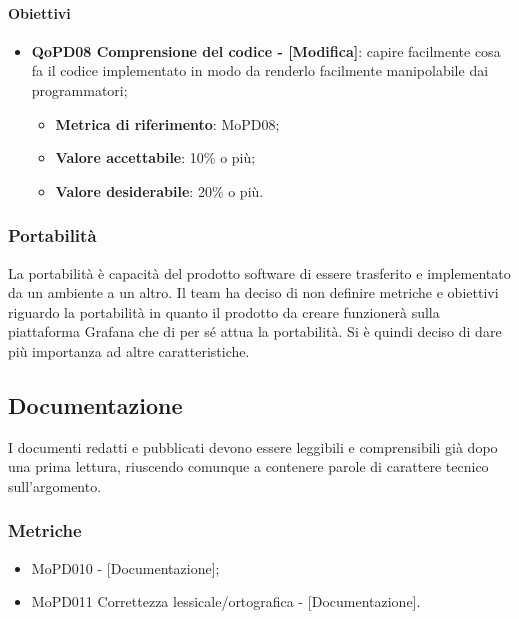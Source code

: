 \documentclass[../piano-di-qualifica.tex]{subfiles}
\begin{document}
\paragraph{Obiettivi}
\label{sub:obiettivi}
\begin{itemize}
    \item \textbf{QoPD08 Comprensione del codice - [Modifica]}: capire facilmente cosa fa il codice implementato in modo da renderlo facilmente manipolabile dai programmatori;
        \begin{itemize}
            \item \textbf{Metrica di riferimento}: MoPD08;
            \item \textbf{Valore accettabile}: 10\% o più;
            \item \textbf{Valore desiderabile}: 20\% o più.
        \end{itemize}
\end{itemize}


\subsubsection{Portabilità}%
\label{sub:portabilita}
La portabilità è capacità del prodotto software di essere trasferito e implementato da un ambiente a un altro.
Il team ha deciso di non definire metriche e obiettivi riguardo la portabilità in quanto il prodotto da creare funzionerà sulla piattaforma Grafana che di per sé attua la portabilità.
Si è quindi deciso di dare più importanza ad altre caratteristiche.

\subsection{Documentazione}%
\label{sub:documentazione}
I documenti redatti e pubblicati devono essere leggibili e comprensibili già dopo una prima lettura, riuscendo comunque a contenere parole di carattere tecnico sull'argomento.

\subsubsection{Metriche}
\label{sub:metriche}
\begin{itemize}
    \item MoPD010  - [Documentazione];
    \item MoPD011 Correttezza lessicale/ortografica - [Documentazione].
\end{itemize}
\end{document}
